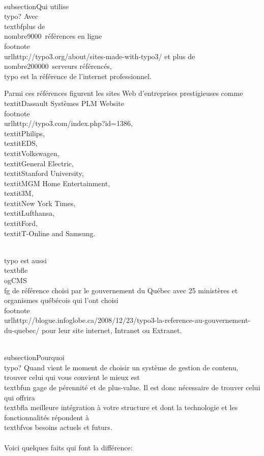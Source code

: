 \documentclass[]{extarticle}
\begin{document}
\\subsection{Qui utilise \\typo?}
Avec \\textbf{plus de \\nombre{9000}~références} en
ligne\\footnote{\\url{http://typo3.org/about/sites-made-with-typo3/}}
et plus de \\nombre{200000}~serveurs référencés, \\typo est la référence
de l'internet professionnel.

Parmi ces références figurent les sites Web
d'entreprises prestigieuses comme \\textit{Dassault Systèmes PLM
  Website}\\footnote{\\url{http://typo3.com/index.php?id=1386}},
\\textit{Philips}, \\textit{EDS}, \\textit{Volkswagen}, \\textit{General
  Electric}, \\textit{Stanford University}, \\textit{MGM Home
  Entertainment}, \\textit{3M}, \\textit{New York Times},
\\textit{Lufthansa}, \\textit{Ford}, \\textit{T-Online and Samsung}.

\\typo est aussi \\textbf{le \\og{}CMS\\fg{} de référence choisi par le
  gouvernement du Québec} avec 25 ministères et organismes québécois qui l'ont
choisi\\footnote{\\url{http://blogue.infoglobe.ca/2008/12/23/typo3-la-reference-au-gouvernement-du-quebec/}}
pour leur site internet, Intranet ou Extranet.

\\subsection{Pourquoi \\typo?}
Quand vient le moment de choisir un système de gestion de
contenu, trouver celui qui vous convient le mieux est \\textbf{un gage de
  pérennité et de plus-value}. Il est donc nécessaire de trouver celui
qui offrira \\textbf{la meilleure intégration} à votre structure et dont la
technologie et les fonctionnalités répondent à \\textbf{vos besoins
  actuels et futurs}.\\\\
Voici quelques faits qui font la différence:
\end{document}
